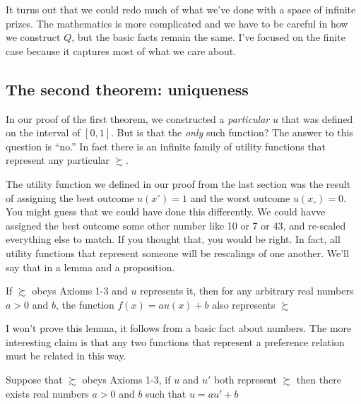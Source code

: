 It turns out that we could redo much of what we've done with a space of infinite prizes.  The mathematics is more complicated and we have to be careful in how we construct $Q$, but the basic facts remain the same.  I've focused on the finite case because it captures most of what we care about.

\subsection{The second theorem: uniqueness}

In our proof of the first theorem, we constructed a {\it particular} $u$ that was defined on the interval of $[0,1]$.  But is that the {\it only} such function?  The answer to this question is ``no.''  In fact there is an infinite family of utility functions that represent any particular $\succsim$.

The utility function we defined in our proof from the last section was the result of assigning the best outcome $u(x^\circ) = 1$ and the worst outcome $u(x_\circ) = 0$.  You might guess that we could have done this differently. We could havve assigned the best outcome some other number like 10 or 7 or 43, and re-scaled everything else to match. If you thought that, you would be right.  In fact, all utility functions that represent someone will be rescalings of one another.  We'll say that in a lemma and a proposition.

\begin{lemma}
If $\succsim$ obeys Axioms 1-3 and $u$ represents it, then for any arbitrary real numbers $a > 0$ and $b$, the function $f(x) = a u(x) + b$ also represents $\succsim$
\end{lemma}

I won't prove this lemma, it follows from a basic fact about numbers. The more interesting claim is that any two functions that represent a preference relation must be related in this way.
\begin{proposition}
\label{p:vn-rep-2}
Suppose that $\succsim$ obeys Axioms 1-3, if $u$ and $u'$ both represent $\succsim$ then there exists real numbers $a > 0$ and $b$ such that $u = au' + b$
\end{proposition}

